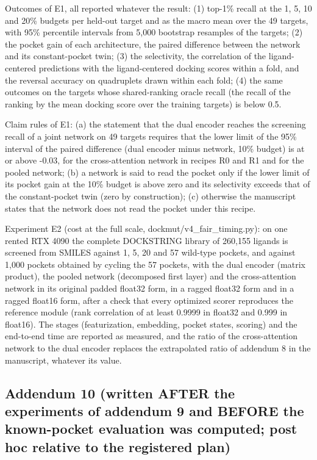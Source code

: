 Outcomes of E1, all reported whatever the result: (1) top-1\% recall at the 1, 5, 10 and 20\% budgets per held-out target and as the macro mean over the 49 targets, with 95\% percentile intervals from 5,000 bootstrap resamples of the targets; (2) the pocket gain of each architecture, the paired difference between the network and its constant-pocket twin; (3) the selectivity, the correlation of the ligand-centered predictions with the ligand-centered docking scores within a fold, and the reversal accuracy on quadruplets drawn within each fold; (4) the same outcomes on the targets whose shared-ranking oracle recall (the recall of the ranking by the mean docking score over the training targets) is below 0.5.

Claim rules of E1: (a) the statement that the dual encoder reaches the screening recall of a joint network on 49 targets requires that the lower limit of the 95\% interval of the paired difference (dual encoder minus network, 10\% budget) is at or above -0.03, for the cross-attention network in recipes R0 and R1 and for the pooled network; (b) a network is said to read the pocket only if the lower limit of its pocket gain at the 10\% budget is above zero and its selectivity exceeds that of the constant-pocket twin (zero by construction); (c) otherwise the manuscript states that the network does not read the pocket under this recipe.

Experiment E2 (cost at the full scale, dockmut/v4\_fair\_timing.py): on one rented RTX 4090 the complete DOCKSTRING library of 260,155 ligands is screened from SMILES against 1, 5, 20 and 57 wild-type pockets, and against 1,000 pockets obtained by cycling the 57 pockets, with the dual encoder (matrix product), the pooled network (decomposed first layer) and the cross-attention network in its original padded float32 form, in a ragged float32 form and in a ragged float16 form, after a check that every optimized scorer reproduces the reference module (rank correlation of at least 0.9999 in float32 and 0.999 in float16). The stages (featurization, embedding, pocket states, scoring) and the end-to-end time are reported as measured, and the ratio of the cross-attention network to the dual encoder replaces the extrapolated ratio of addendum 8 in the manuscript, whatever its value.

\subsection*{Addendum 10 (written AFTER the experiments of addendum 9 and BEFORE the known-pocket evaluation was computed; post hoc relative to the registered plan)}

